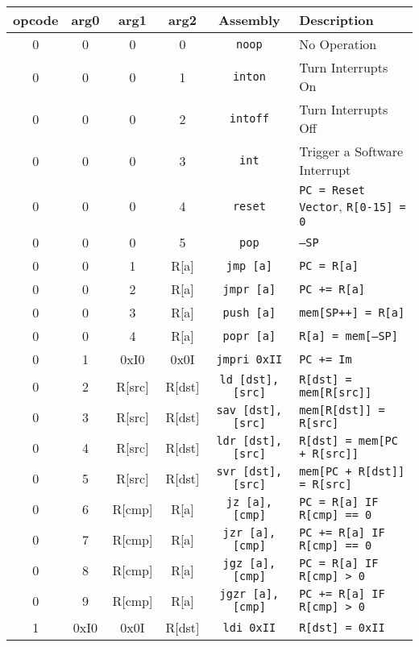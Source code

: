 \documentclass{article}
\begin{document}
\begin{table}[h!]
	\centering
	\begin{footnotesize}
		\begin{tabular}{cccc|c|l}
			\hline
			opcode & arg0 & arg1 & arg2 & Assembly & Description \\
			\hline
			0 & 0 & 0 & 0 & \texttt{noop} & No Operation \\
			0 & 0 & 0 & 1 & \texttt{inton} & Turn Interrupts On \\
			0 & 0 & 0 & 2 & \texttt{intoff} & Turn Interrupts Off \\
			0 & 0 & 0 & 3 & \texttt{int} & Trigger a Software Interrupt \\
			0 & 0 & 0 & 4 & \texttt{reset} & \texttt{PC = Reset Vector}, \texttt{R[0-15] = 0} \\
			0 & 0 & 0 & 5 & \texttt{pop} & \texttt{--SP} \\
			0 & 0 & 1 & R[a] & \texttt{jmp [a]} & \texttt{PC = R[a]} \\
			0 & 0 & 2 & R[a] & \texttt{jmpr [a]} & \texttt{PC += R[a]} \\
			0 & 0 & 3 & R[a] & \texttt{push [a]} & \texttt{mem[SP++] = R[a]} \\
			0 & 0 & 4 & R[a] & \texttt{popr [a]} & \texttt{R[a] = mem[--SP]} \\
			0 & 1 & 0xI0 & 0x0I & \texttt{jmpri 0xII} & \texttt{PC += Im} \\
			0 & 2 & R[src] & R[dst] & \texttt{ld [dst], [src]} & \texttt{R[dst] = mem[R[src]]} \\
			0 & 3 & R[src] & R[dst] & \texttt{sav [dst], [src]} & \texttt{mem[R[dst]] = R[src]} \\
			0 & 4 & R[src] & R[dst] & \texttt{ldr [dst], [src]} & \texttt{R[dst] = mem[PC + R[src]]} \\
			0 & 5 & R[src] & R[dst] & \texttt{svr [dst], [src]} & \texttt{mem[PC + R[dst]] = R[src]} \\
			0 & 6 & R[cmp] & R[a] & \texttt{jz [a], [cmp]} & \texttt{PC = R[a] IF R[cmp] == 0} \\
			0 & 7 & R[cmp] & R[a] & \texttt{jzr [a], [cmp]} & \texttt{PC += R[a] IF R[cmp] == 0} \\
			0 & 8 & R[cmp] & R[a] & \texttt{jgz [a], [cmp]} & \texttt{PC = R[a] IF R[cmp] > 0} \\
			0 & 9 & R[cmp] & R[a] & \texttt{jgzr [a], [cmp]} & \texttt{PC += R[a] IF R[cmp] > 0} \\
			1 & 0xI0 & 0x0I & R[dst] & \texttt{ldi 0xII} & \texttt{R[dst] = 0xII} \\

\end{tabular}
\end{footnotesize}
\end{table}
\end{document}
